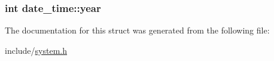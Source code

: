 \subsubsection[{year}]{\setlength{\rightskip}{0pt plus 5cm}int date\+\_\+time\+::year}\label{structdate__time_ae96e2e4cc09780eaac04038e12bbe06b}


The documentation for this struct was generated from the following file\+:\begin{DoxyCompactItemize}
\item 
include/\hyperlink{system_8h}{system.\+h}\end{DoxyCompactItemize}
